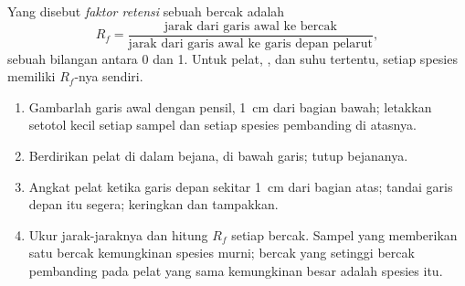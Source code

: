 \begin{definition}\label{def:g10:chemical-species:retention-factor}
Yang disebut \emph{faktor retensi} sebuah bercak adalah
\[
  R_f = \frac{\text{jarak dari garis awal ke bercak}}
             {\text{jarak dari garis awal ke garis depan pelarut}},
\]
sebuah bilangan antara 0 dan 1. Untuk pelat, , dan suhu tertentu,
setiap spesies memiliki $R_f$-nya sendiri.
\end{definition}

\begin{method}\label{met:g10:chemical-species:tlc}
\begin{enumerate}
  \item Gambarlah garis awal dengan pensil, \qty{1}{cm} dari bagian
        bawah; letakkan setotol kecil setiap sampel dan setiap spesies
        pembanding di atasnya.
  \item Berdirikan pelat di dalam bejana,  di bawah garis; tutup
        bejananya.
  \item Angkat pelat ketika garis depan sekitar \qty{1}{cm} dari bagian
        atas; tandai garis depan itu segera; keringkan dan tampakkan.
  \item Ukur jarak-jaraknya dan hitung $R_f$ setiap bercak. Sampel yang
        memberikan satu bercak kemungkinan spesies murni; bercak yang
        setinggi bercak pembanding pada pelat yang sama kemungkinan besar
        adalah spesies itu.
\end{enumerate}
\end{method}

